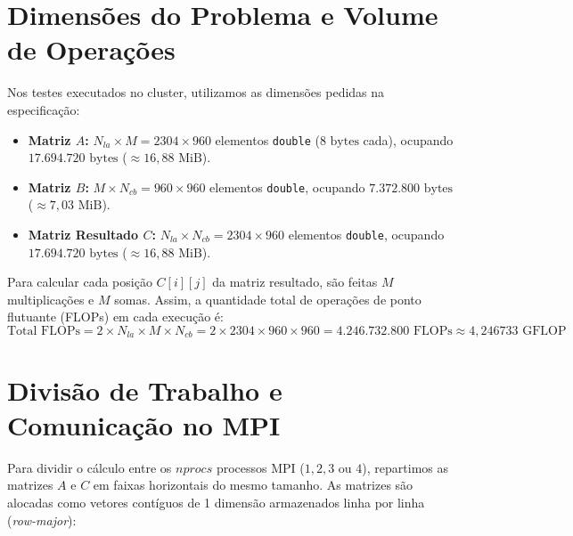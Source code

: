 \documentclass[12pt, a4paper, twoside, chapter=TITLE, subsection=TITLE, section=TITLE, subsubsection=TITLE, english, brazil]{abntex2}
\begin{document}
\section{Dimensões do Problema e Volume de Operações}
Nos testes executados no cluster, utilizamos as dimensões pedidas na especificação:
\begin{itemize}
    \item \textbf{Matriz $A$:} $N_{la} \times M = 2304 \times 960$ elementos \texttt{double} ($8\text{ bytes}$ cada), ocupando $17.694.720\text{ bytes}$ ($\approx 16,88\text{ MiB}$).
    \item \textbf{Matriz $B$:} $M \times N_{cb} = 960 \times 960$ elementos \texttt{double}, ocupando $7.372.800\text{ bytes}$ ($\approx 7,03\text{ MiB}$).
    \item \textbf{Matriz Resultado $C$:} $N_{la} \times N_{cb} = 2304 \times 960$ elementos \texttt{double}, ocupando $17.694.720\text{ bytes}$ ($\approx 16,88\text{ MiB}$).
\end{itemize}

Para calcular cada posição $C[i][j]$ da matriz resultado, são feitas $M$ multiplicações e $M$ somas. Assim, a quantidade total de operações de ponto flutuante (FLOPs) em cada execução é:
\begin{equation}
    \text{Total FLOPs} = 2 \times N_{la} \times M \times N_{cb} = 2 \times 2304 \times 960 \times 960 = 4.246.732.800\text{ FLOPs} \approx 4,246733\text{ GFLOP}
\end{equation}

\section{Divisão de Trabalho e Comunicação no MPI}
Para dividir o cálculo entre os $nprocs$ processos MPI ($1, 2, 3$ ou $4$), repartimos as matrizes $A$ e $C$ em faixas horizontais do mesmo tamanho. As matrizes são alocadas como vetores contíguos de 1 dimensão armazenados linha por linha (\textit{row-major}):
\end{document}
